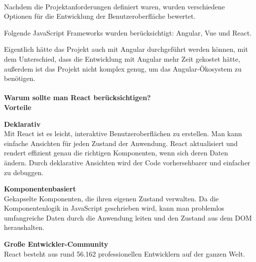\paragraph{}

Nachdem die Projektanforderungen definiert waren, wurden verschiedene Optionen für die Entwicklung der Benutzeroberfläche bewertet.

Folgende JavaScript Frameworks wurden berücksichtigt: Angular, Vue und React.

Eigentlich hätte das Projekt auch mit Angular durchgeführt werden können, mit dem Unterschied, dass die Entwicklung mit Angular mehr Zeit gekostet hätte, außerdem ist das Projekt nicht komplex genug, um das Angular-Ökosystem zu benötigen.


\paragraph{}
\textbf{Warum sollte man React berücksichtigen?}\\
\newline
\textbf{Vorteile} 
\newline

\textbf{Deklarativ} \\
Mit React ist es leicht, interaktive Benutzeroberflächen zu erstellen. 
Man kann einfache Ansichten für jeden Zustand der Anwendung. 
React aktualisiert und rendert effizient genau die richtigen Komponenten, wenn sich deren Daten ändern.
Durch deklarative Ansichten wird der Code vorhersehbarer und einfacher zu debuggen.
\newline

\textbf{Komponentenbasiert}\\
Gekapselte Komponenten, die ihren eigenen Zustand verwalten.
Da die Komponentenlogik in JavaScript geschrieben wird, kann man problemlos umfangreiche Daten durch die Anwendung leiten und den Zustand aus dem DOM heraushalten.
\newline

\textbf{Große Entwickler-Community}\\
React besteht aus rund 56.162 professionellen Entwicklern auf der ganzen Welt.

